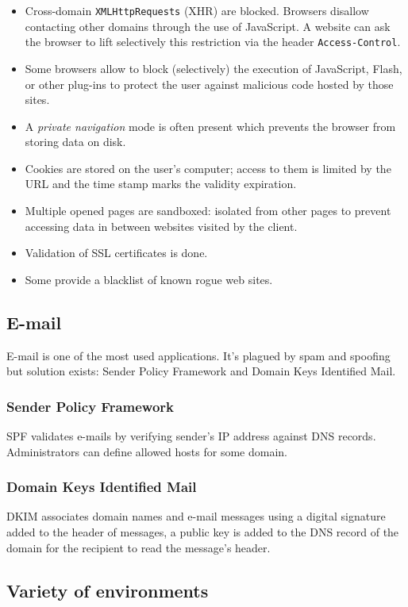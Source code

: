 \begin{itemize}
\item Cross-domain \texttt{XMLHttpRequests} (XHR) are blocked.
	Browsers disallow contacting other domains through the use of JavaScript.
	A website can ask the browser to lift selectively this restriction via the
	header \texttt{Access-Control}.
\item Some browsers allow to block (selectively) the execution of JavaScript,
	Flash, or other plug-ins to protect the user against malicious code hosted
	by those sites.
\item A \emph{private navigation} mode is often present which prevents the browser
	from storing data on disk.
\item Cookies are stored on the user's computer; access to them is limited by
	the URL and the time stamp marks the validity expiration.
\item Multiple opened pages are sandboxed: isolated from other pages to
	prevent accessing data in between websites visited by the client.
\item Validation of SSL certificates is done.
\item Some provide a blacklist of known rogue web sites.
\end{itemize}

\subsection{E-mail}

E-mail is one of the most used applications. It's plagued by spam and
spoofing but solution exists: Sender Policy Framework and Domain Keys
Identified Mail.

\subsubsection{Sender Policy Framework}
SPF validates e-mails by verifying sender's IP address against DNS records.
Administrators can define allowed hosts for some domain.

\subsubsection{Domain Keys Identified Mail}
DKIM associates domain names and e-mail messages using a digital signature
added to the header of messages, a public key is added to the DNS record of
the domain for the recipient to read the message's header.

\subsection{Variety of environments}

